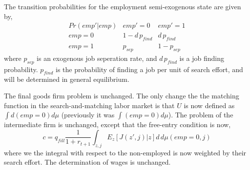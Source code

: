 The transition probabilities for the employment semi-exogenous state are given by,
\begin{eqnarray*}
 Pr(emp'|emp) & emp'=0 & emp'=1 \\
 emp=0 & 1-d\,p_{find} & d\,p_{find} \\
 emp=1 & p_{sep} & 1-p_{sep}
\end{eqnarray*}
where $p_{sep}$ is an exogenous job seperation rate, and $d\, p_{find}$ is a job finding probability. $p_{find}$ is the probability of finding a job per unit of search effort, and will be determined in general equilibrium.

The final goods firm problem is unchanged. The only change the the matching function in the search-and-matching labor market is that $U$ is now defined as $\int d (emp=0) d\mu$ (previously it was $\int (emp=0) d\mu$). The problem of the intermediate firm is unchanged, except that the free-entry condition is now,
\begin{equation*}
 c=q_{fill} \frac{1}{1+r_{t+1}} \int_{z,j} E_z[J(z',j)|z] d\, d\mu(emp=0,j)
\end{equation*}
where we the integral with respect to the non-employed is now weighted by their search effort. The determination of wages is unchanged.




